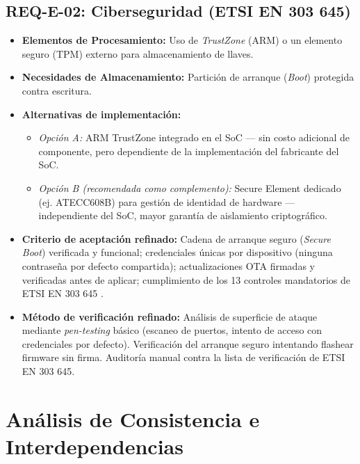 \documentclass[%
	paper=a4,
	twoside=false,
	parskip=half,
	chapterprefix=false,
	10pt,
	headings=normal,
	bibliography=totoc,
	listof=totoc,
	titlepage=on,
	captions=tableabove,
	draft=false,
]{scrbook}%
\begin{document}
\section{REQ-E-02: Ciberseguridad (ETSI EN 303 645)}
\begin{itemize}
    \item \textbf{Elementos de Procesamiento:} Uso de \textit{TrustZone} (ARM) o un elemento seguro (TPM) externo para almacenamiento de llaves.
    \item \textbf{Necesidades de Almacenamiento:} Partición de arranque (\textit{Boot}) protegida contra escritura.
    \item \textbf{Alternativas de implementación:}
        \begin{itemize}
            \item \textit{Opción A:} ARM TrustZone integrado en el SoC — sin costo adicional de componente, pero dependiente de la implementación del fabricante del SoC.
            \item \textit{Opción B (recomendada como complemento):} Secure Element dedicado (ej. ATECC608B) para gestión de identidad de hardware — independiente del SoC, mayor garantía de aislamiento criptográfico.
        \end{itemize}
    \item \textbf{Criterio de aceptación refinado:} Cadena de arranque seguro (\textit{Secure Boot}) verificada y funcional; credenciales únicas por dispositivo (ninguna contraseña por defecto compartida); actualizaciones OTA firmadas y verificadas antes de aplicar; cumplimiento de los 13 controles mandatorios de ETSI EN 303 645 \cite{etsi303645}.
    \item \textbf{Método de verificación refinado:} Análisis de superficie de ataque mediante \textit{pen-testing} básico (escaneo de puertos, intento de acceso con credenciales por defecto). Verificación del arranque seguro intentando flashear firmware sin firma. Auditoría manual contra la lista de verificación de ETSI EN 303 645.
\end{itemize}

\chapter{Análisis de Consistencia e Interdependencias}
\label{chap:consistencia}
\end{document}
